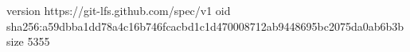 version https://git-lfs.github.com/spec/v1
oid sha256:a59dbba1dd78a4c16b746fcacbd1c1d470008712ab9448695bc2075da0ab6b3b
size 5355
